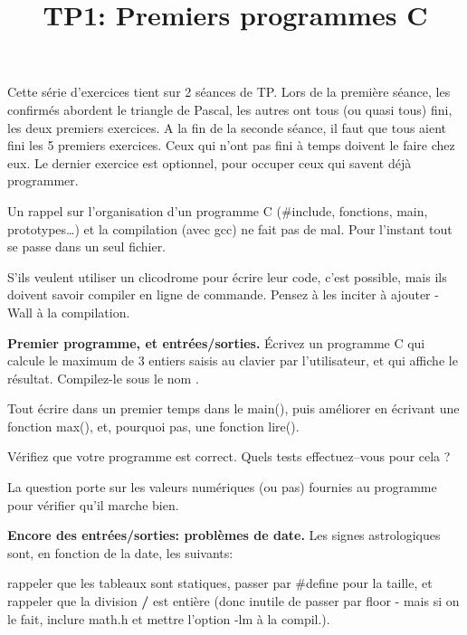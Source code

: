 \documentclass[10pt]{article}\usepackage[correction]{esial}
\begin{document}
\title{TP1: Premiers programmes C}
\maketitle


\begin{Reponse}
  Cette série d'exercices tient sur 2 séances de TP.  Lors de la première
  séance, les confirmés abordent le triangle de Pascal, les autres ont tous (ou
  quasi tous) fini, les deux premiers exercices. A la fin de la seconde séance,
  il faut que tous aient fini les 5 premiers exercices. Ceux qui n'ont pas fini
  à temps doivent le faire chez eux. Le dernier exercice est optionnel, pour
  occuper ceux qui savent déjà programmer.

  Un rappel sur l'organisation d'un programme C (\#include, fonctions, main,
  prototypes\ldots) et la compilation (avec gcc) ne fait pas de mal. Pour
  l'instant tout se passe dans un seul fichier.

  S'ils veulent utiliser un clicodrome pour écrire leur code, c'est possible,
  mais ils doivent savoir compiler en ligne de commande. Pensez à les inciter à
  ajouter -Wall à la compilation.
\end{Reponse}
\Exercice \textbf{Premier programme, et entrées/sorties.}
\Question Écrivez un programme C qui calcule le maximum de 3 entiers saisis au
clavier par l'utilisateur, et qui affiche le résultat. Compilez-le sous le nom
. 

\begin{Reponse}
  Tout écrire dans un premier temps dans le main(), puis améliorer en écrivant
  une fonction max(), et, pourquoi pas, une fonction lire().
\end{Reponse}

\Question Vérifiez que votre programme est correct. Quels tests effectuez--vous
pour cela ?

\begin{Reponse}
  La question porte sur les valeurs numériques (ou pas) fournies au programme
  pour vérifier qu'il marche bien.
\end{Reponse}

\Exercice \textbf{Encore des entrées/sorties: problèmes de date.}
Les signes astrologiques sont, en fonction de la date, les suivants: 

\begin{Reponse}
  rappeler que les tableaux sont statiques, passer par \#define pour la taille,
  et rappeler que la division {\bf /} est entière (donc inutile de passer par
  floor - mais si on le fait, inclure math.h et mettre l'option -lm à la
  compil.).
\end{Reponse}
\end{document}

